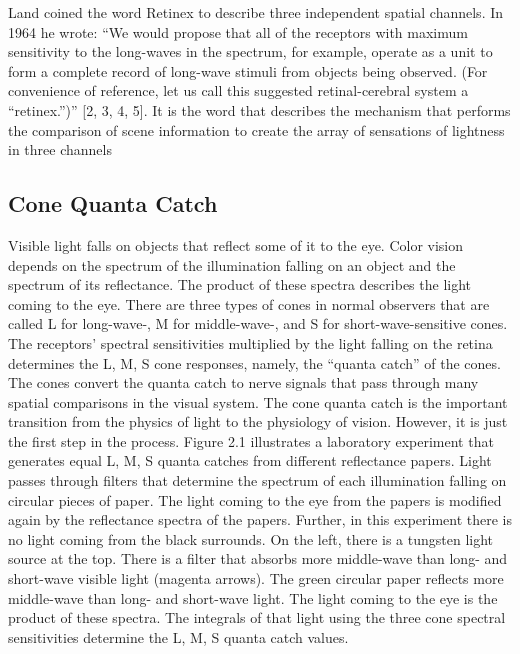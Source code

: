 Land coined the word Retinex to describe three independent spatial channels. In 1964 he wrote: “We would propose that all of the receptors with maximum sensitivity to the long-waves in the spectrum, for example, operate as a unit to form a complete record of long-wave stimuli from objects being observed. (For convenience of reference, let us call this suggested retinal-cerebral system a “retinex.”)” [2, 3, 4, 5]. It is the word that describes the mechanism that performs the comparison of scene information to create the array of sensations of lightness in three channels


\subsection{Cone Quanta Catch}
Visible light falls on objects that reflect some of it to the eye. Color vision depends on the spectrum of the illumination falling on an object and the spectrum of its reflectance. The product of these spectra describes the light coming to the eye. There are three types of cones in normal observers that are called L for long-wave-, M for middle-wave-, and S for short-wave-sensitive cones. The receptors’ spectral sensitivities multiplied by the light falling on the retina determines the L, M, S cone responses, namely, the “quanta catch” of the cones. The cones convert the quanta catch to nerve signals that pass through many spatial comparisons in the visual system. The cone quanta catch is the important transition from the physics of light to the physiology of vision. However, it is just the first step in the process.
Figure 2.1 illustrates a laboratory experiment that generates equal L, M, S quanta catches from different reflectance papers.
Light passes through filters that determine the spectrum of each illumination falling on circular pieces of paper. The light coming to the eye from the papers is modified again by the reflectance spectra of the papers. Further, in this experiment there is no light coming from the black surrounds.
On the left, there is a tungsten light source at the top. There is a filter that absorbs more middle-wave than long- and short-wave visible light (magenta arrows). The green circular paper reflects more middle-wave than long- and short-wave light. The light coming to the eye is the product of these spectra. The integrals of that light using the three cone spectral sensitivities determine the L, M, S quanta catch values.



